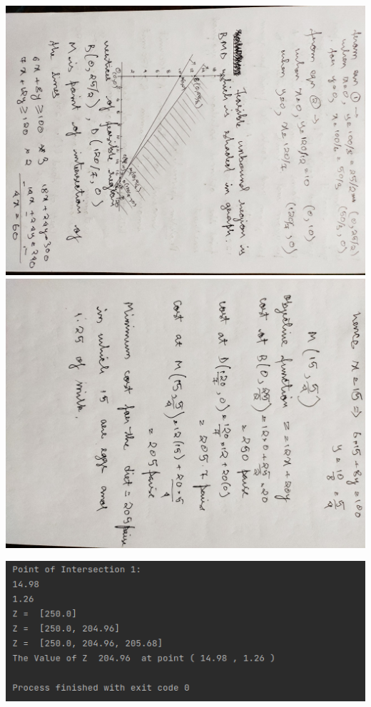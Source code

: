 \documentclass{article}
\begin{document}
\includegraphics[width=\paperheight, height=\paperwidth, angle=90]{Page7}
\includegraphics[width=\paperheight, height=\paperwidth, angle=90]{Page8}

\begin{flushleft}
\includegraphics[width=\paperwidth]{Output2}
\end{flushleft}
\end{document}
